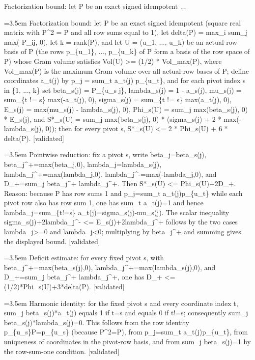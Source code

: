 \documentclass{article}
\newcommand{\step}[1]{\par\noindent\hangindent=3.5em\hangafter=1%
  \makebox[3.5em][l]{\textbf{#1.}}}
\newcommand{\steptag}[1]{\hfill{\small\textsf{[#1]}}}
\begin{document}
\begin{proofbox}{Factorization bound: let P be an exact signed idempotent ...}
\step{1} Factorization bound: let P be an exact signed idempotent (square real matrix with P\textasciicircum{}2 = P and all row sums equal to 1), let delta(P) = max\_i sum\_j max(-P\_ij, 0), let k = rank(P), and let U = (u\_1, ..., u\_k) be an actual-row basis of P (the rows p\_\{u\_1\}, ..., p\_\{u\_k\} of P form a basis of the row space of P) whose Gram volume satisfies Vol(U) >= (1/2) * Vol\_max(P), where Vol\_max(P) is the maximum Gram volume over all actual-row bases of P; define coordinates a\_t(j) by p\_j = sum\_t a\_t(j) p\_\{u\_t\}, and for each pivot index s in \{1, ..., k\} set beta\_s(j) = P\_\{u\_s j\}, lambda\_s(j) = 1 - a\_s(j), mu\_s(j) = sum\_\{t != s\} max(-a\_t(j), 0), sigma\_s(j) = sum\_\{t != s\} max(a\_t(j), 0), E\_s(j) = max(mu\_s(j) - lambda\_s(j), 0), Phi\_s(U) = sum\_j max(beta\_s(j), 0) * E\_s(j), and S*\_s(U) = sum\_j max(beta\_s(j), 0) * (sigma\_s(j) + 2 * max(-lambda\_s(j), 0)); then for every pivot s, S*\_s(U) <= 2 * Phi\_s(U) + 6 * delta(P). \steptag{validated} \\[6pt]
\step{1.1} Pointwise reduction: fix a pivot s, write beta\_j=beta\_s(j), beta\_j\textasciicircum{}+=max(beta\_j,0), lambda\_j=lambda\_s(j), lambda\_j\textasciicircum{}+=max(lambda\_j,0), lambda\_j\textasciicircum{}-=max(-lambda\_j,0), and D\_+=sum\_j beta\_j\textasciicircum{}+ lambda\_j\textasciicircum{}+. Then S*\_s(U) <= Phi\_s(U)+2D\_+. Reason: because P has row sums 1 and p\_j=sum\_t a\_t(j)p\_\{u\_t\} while each pivot row also has row sum 1, one has sum\_t a\_t(j)=1 and hence lambda\_j=sum\_\{t!=s\} a\_t(j)=sigma\_s(j)-mu\_s(j). The scalar inequality sigma\_s(j)+2lambda\_j\textasciicircum{}- <= E\_s(j)+2lambda\_j\textasciicircum{}+ follows by the two cases lambda\_j>=0 and lambda\_j<0; multiplying by beta\_j\textasciicircum{}+ and summing gives the displayed bound. \steptag{validated} \\[4pt]
\step{1.2} Deficit estimate: for every fixed pivot s, with beta\_j\textasciicircum{}+=max(beta\_s(j),0), lambda\_j\textasciicircum{}+=max(lambda\_s(j),0), and D\_+=sum\_j beta\_j\textasciicircum{}+ lambda\_j\textasciicircum{}+, one has D\_+ <= (1/2)*Phi\_s(U)+3*delta(P). \steptag{validated} \\[6pt]
\step{1.2.1} Harmonic identity: for the fixed pivot s and every coordinate index t, sum\_j beta\_s(j)*a\_t(j) equals 1 if t=s and equals 0 if t!=s; consequently sum\_j beta\_s(j)*lambda\_s(j)=0. This follows from the row identity p\_\{u\_s\}P=p\_\{u\_s\} (because P\textasciicircum{}2=P), from p\_j=sum\_t a\_t(j)p\_\{u\_t\}, from uniqueness of coordinates in the pivot-row basis, and from sum\_j beta\_s(j)=1 by the row-sum-one condition. \steptag{validated} \\[4pt]

\end{proofbox}
\end{document}
